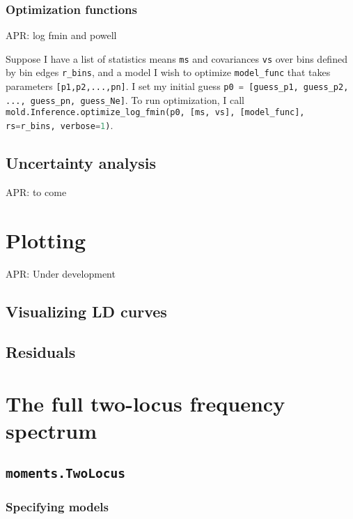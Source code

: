 \documentclass[10pt]{article}
\makeatletter
\renewcommand{\cite}{\citep}
\newcommand{\comment}[1]{{\color{blue}APR: #1}}
\newcommand{\py}[1]{\lstinline[breaklines=true,language=Python, showstringspaces=False]@#1@}
\makeatother
\begin{document}
\subsubsection{Optimization functions}
\comment{log fmin and powell}

Suppose I have a list of statistics means \py{ms} and covariances \py{vs} over bins defined by bin edges \py{r_bins}, and a model I wish to optimize \py{model_func} that takes parameters \py{[p1,p2,...,pn]}.
I set my initial guess \py{p0 = [guess_p1, guess_p2, ..., guess_pn, guess_Ne]}.
To run optimization, I call\\
\py{mold.Inference.optimize_log_fmin(p0, [ms, vs], [model_func], rs=r_bins, verbose=1)}.

\subsection{Uncertainty analysis}

\comment{to come}

\cite{Coffman2016}

\section{Plotting}\label{section:plotting}

\comment{Under development}

\subsection{Visualizing LD curves}


\subsection{Residuals}


\section{The full two-locus frequency spectrum}

\subsection{\texttt{moments.TwoLocus}}

\subsubsection{Specifying models}
\end{document}
